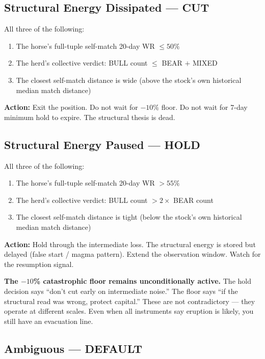 \documentclass[11pt, a4paper]{article}
\begin{document}
\subsection{Structural Energy Dissipated --- CUT}

All three of the following:
\begin{enumerate}
  \item The horse's full-tuple self-match 20-day WR $\leq 50\%$
  \item The herd's collective verdict: BULL count $\leq$ BEAR $+$ MIXED
  \item The closest self-match distance is wide (above the stock's own
        historical median match distance)
\end{enumerate}

\textbf{Action:} Exit the position. Do not wait for $-10$\% floor.
Do not wait for 7-day minimum hold to expire. The structural thesis
is dead.

\subsection{Structural Energy Paused --- HOLD}

All three of the following:
\begin{enumerate}
  \item The horse's full-tuple self-match 20-day WR $> 55\%$
  \item The herd's collective verdict: BULL count $> 2 \times$ BEAR count
  \item The closest self-match distance is tight (below the stock's own
        historical median match distance)
\end{enumerate}

\textbf{Action:} Hold through the intermediate loss. The structural energy
is stored but delayed (false start / magma pattern). Extend the observation
window. Watch for the resumption signal.

\textbf{The $-10$\% catastrophic floor remains unconditionally active.}
The hold decision says ``don't cut early on intermediate noise.'' The floor
says ``if the structural read was wrong, protect capital.'' These are not
contradictory --- they operate at different scales. Even when all instruments
say eruption is likely, you still have an evacuation line.

\subsection{Ambiguous --- DEFAULT}
\end{document}
